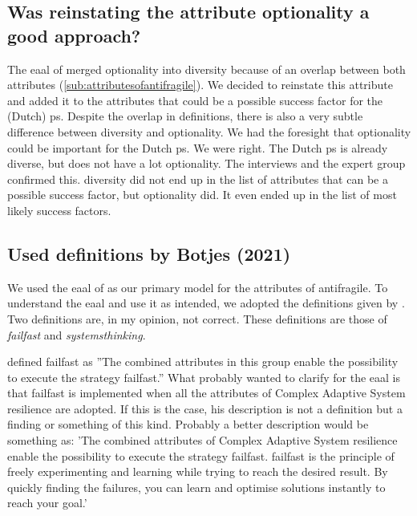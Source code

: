 \subsection{Was reinstating the attribute optionality a good approach?}
\label{sub:reinstating optionality}
The \acrlong{eaal} of \textcite{Botjes2021} merged \gls{optionality} into \gls{diversity} because of an overlap between both \glspl{attribute} (\cref{sub:attributesofantifragile}). We decided to reinstate this attribute and added it to the attributes that could be a possible success factor for the (Dutch) \gls{ps}. Despite the overlap in definitions, there is also a very subtle difference between \gls{diversity} and \gls{optionality}. We had the foresight that \gls{optionality} could be important for the Dutch \gls{ps}. We were right. The Dutch \gls{ps} is already diverse, but does not have a lot optionality. The interviews and the expert group confirmed this. \Gls{diversity} did not end up in the list of \glspl{attribute} that can be a possible success factor, but \gls{optionality} did. It even ended up in the list of most likely success factors.

\subsection{Used definitions by Botjes (2021)}
\label{sub:systemsthinkingdiscussion}
We used the \acrlong{eaal} of \textcite{Botjes2021} as our primary model for the \glspl{attribute} of \gls{antifragile}. To understand the \acrlong{eaal} and use it as intended, we adopted the definitions given by \textcite{Botjes2021}. Two definitions are, in my opinion, not correct. These definitions are those of \textit{\gls{failfast}} and \textit{\gls{systemsthinking}}.

\Textcite[Table II]{Botjes2021} defined \gls{failfast} as ''The combined attributes in this group enable the possibility to execute the strategy \gls{failfast}.'' What \textcite{Botjes2021} probably wanted to clarify for the \acrlong{eaal} is that \gls{failfast} is implemented when all the \glspl{attribute} of Complex Adaptive System resilience are adopted. If this is the case, his description is not a definition but a finding or something of this kind. Probably a better description would be something as: 'The combined attributes of Complex Adaptive System resilience enable the possibility to execute the strategy \gls{failfast}. \Gls{failfast} is the principle of freely experimenting and learning while trying to reach the desired result. By quickly finding the failures, you can learn and optimise solutions instantly to reach your goal.'

